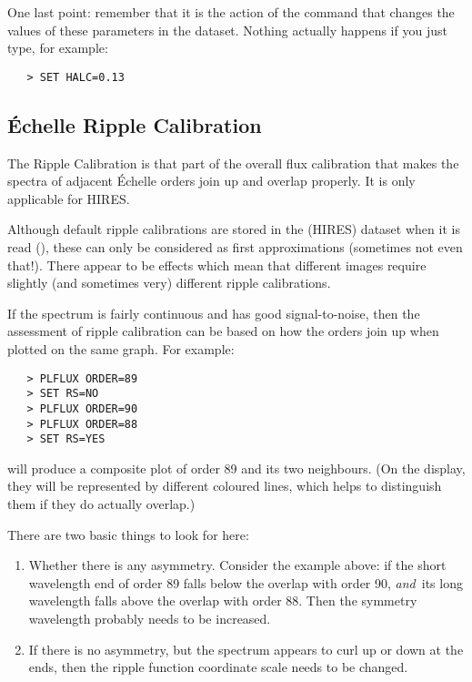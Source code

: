 One last point: remember that it is the action of the
 command that changes the values of these
parameters in the dataset.  Nothing actually happens if you just type,
for example:

\begin{verbatim}
   > SET HALC=0.13
\end{verbatim}


\subsection{\'{E}chelle Ripple Calibration}

The Ripple Calibration is that part of the overall flux calibration that
makes the spectra of adjacent \'{E}chelle orders join up and overlap properly.
It is only applicable for HIRES\@.

Although default ripple calibrations are stored in the (HIRES) dataset when
it is read (), these can only be
considered as first approximations (sometimes not even that!)\@.
There appear to be effects which mean that different images require
slightly (and sometimes very) different ripple calibrations.

If the spectrum is fairly continuous and has good signal-to-noise, then the
assessment of ripple calibration can be based on how the orders join up when
plotted on the same graph.  For example:

\begin{verbatim}
   > PLFLUX ORDER=89
   > SET RS=NO
   > PLFLUX ORDER=90
   > PLFLUX ORDER=88
   > SET RS=YES
\end{verbatim}

will produce a composite plot of order 89 and its two neighbours.  (On the
display, they will be represented by different coloured lines, which
helps to distinguish them if they do actually overlap.\@)

There are two basic things to look for here:

\begin{enumerate}

\item Whether there is any asymmetry.  Consider the example above: if the
      short wavelength end of order 89 falls below the overlap with order 90,
      {\em and\,} its long wavelength falls above the overlap with order 88.
      Then the symmetry wavelength probably needs to be increased.

\item If there is no asymmetry, but the spectrum appears to curl up or down at
      the ends, then the ripple function coordinate scale needs to be changed.

\end{enumerate}

